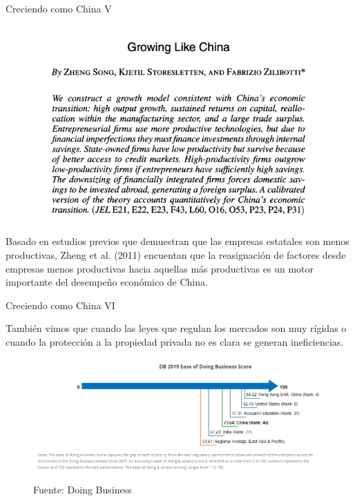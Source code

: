 \documentclass{beamer}
\let\tempone\itemize
\let\temptwo\enditemize
\renewenvironment{itemize}{\tempone\addtolength{\itemsep}{0.5\baselineskip}}{\temptwo}
\begin{document}
	\begin{frame}{Creciendo como China V}
		\begin{figure}
			\centering
			\includegraphics[width=.6\linewidth, keepaspectratio]{growing_like_china}
		\end{figure}
		\begin{itemize}
			\item Basado en estudios previos que demuestran que las empresas estatales son menos productivas, Zheng et al. (2011) encuentan que la reasignación de factores desde empresas menos productivas hacia aquellas más productivas es un motor importante del desempeño económico de China.
		\end{itemize}
	\end{frame}

	\begin{frame}{Creciendo como China VI}
		\begin{itemize}
			\item También vimos que cuando las leyes que regulan los mercados son muy rígidas o cuando la protección a la propiedad privada no es clara se generan ineficiencias.
		\end{itemize}
	\end{frame}

	\begin{frame}[plain]
		\begin{figure}
			\centering
			\includegraphics[width=\linewidth, keepaspectratio]{doing_business_rank} \\
			{\footnotesize{Fuente: Doing Business}}
		\end{figure}
	\end{frame}
\end{document}
